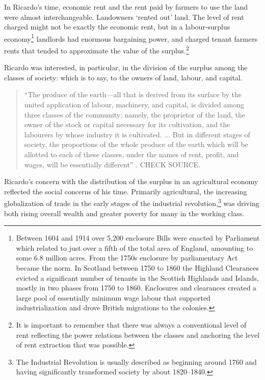 In Ricardo's time, economic rent and the rent paid by farmers to use the land were almost interchangeable. Landowners `rented out' land. The level of rent charged might not be exactly the economic rent, but in a labour-surplus economy\footnote{Between 1604 and 1914 over 5,200 enclosure Bills were enacted by Parliament which related to just over a fifth of the total area of England, amounting to some 6.8 million acres. From the 1750s enclosure by parliamentary Act became the norm. In Scotland  between 1750 to 1860 the  Highland Clearances  evicted a significant number of tenants in the Scottish Highlands and Islands, mostly in two phases from 1750 to 1860. Enclosures and clearances created a large pool of essentially minimum wage labour that supported industrialization and drove British migrations to the colonies.} landlords had enormous bargaining power, and charged tenant farmers rents that tended to approximate the value of the \gls{surplus}.\footnote{It is important to remember that there was always a conventional level of rent reflecting the power relations between the classes and anchoring the level of rent extraction that was possible.} 


Ricardo was interested, in particular, in the division of the surplus among the classes of society:  which is to say, to the owners of land, labour, and capital.\begin{quotation}
 ``The produce of the earth---all that is derived from its surface by the united application of labour, machinery, and capital, is divided among three classes of the community; namely, the proprietor of the land, the owner of the stock or capital necessary for its cultivation, and the labourers by whose industry it is cultivated. ...  But in different stages of society, the proportions of the whole produce of the earth which will be allotted to each of these classes, under the names of rent, profit, and wages, will be essentially different''  \cite{ricardoEssayInfluenceLow1815}. CHECK SOURCE.
\end{quotation}
Ricardo's concern with the distribution of the surplus in an agricultural economy reflected the social concerns of his time. Primarily agricultural, the increasing globalization of trade in the early stages of the industrial revolution,\footnote{The Industrial Revolution is usually described as beginning around 1760 and having significantly transformed society by about 1820--1840.} was driving both rising overall wealth and greater poverty for many in the working class.

